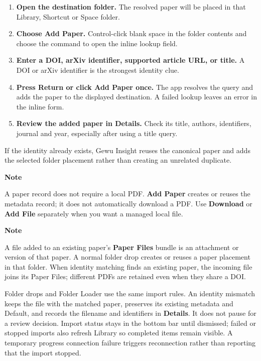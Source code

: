 \documentclass[10pt,letterpaper,oneside]{scrreprt}
\providecommand{\tightlist}{\setlength{\itemsep}{1pt}\setlength{\parskip}{0pt}}
\renewenvironment{quote}
  {\Needspace{5\baselineskip}\begin{tcolorbox}[enhanced,breakable,colback=GewuPale,colframe=GewuPale,boxrule=0pt,
    borderline west={1.6pt}{0pt}{GewuBlue},arc=1.2mm,left=2.5mm,right=2.5mm,top=1.7mm,bottom=1.7mm,
    before skip=4pt,after skip=5pt,fontupper=\color{GewuInk}\small]}
  {\end{tcolorbox}}
\begin{document}
\begin{enumerate}
\tightlist
\item
  \textbf{Open the destination folder.} The resolved paper will be placed in that Library, Shortcut or Space folder.
\item
  \textbf{Choose \textbf{Add Paper}.} Control-click blank space in the folder contents and choose the command to open the inline lookup field.
\item
  \textbf{Enter a DOI, arXiv identifier, supported article URL, or title.} A DOI or arXiv identifier is the strongest identity clue.
\item
  \textbf{Press Return or click \textbf{Add Paper} once.} The app resolves the query and adds the paper to the displayed destination. A failed lookup leaves an error in the inline form.
\item
  \textbf{Review the added paper in Details.} Check its title, authors, identifiers, journal and year, especially after using a title query.
\end{enumerate}

If the identity already exists, Gewu Insight reuses the canonical paper and adds the selected folder placement rather than creating an unrelated duplicate.

\begin{quote}
\textbf{Note}

A paper record does not require a local PDF. \textbf{Add Paper} creates or reuses the metadata record; it does not automatically download a PDF. Use \textbf{Download} or \textbf{Add File} separately when you want a managed local file.
\end{quote}

\begin{quote}
\textbf{Note}

A file added to an existing paper's \textbf{Paper Files} bundle is an attachment or version of that paper. A normal folder drop creates or reuses a paper placement in that folder. When identity matching finds an existing paper, the incoming file joins its Paper Files; different PDFs are retained even when they share a DOI.
\end{quote}

Folder drops and Folder Loader use the same import rules. An identity mismatch keeps the file with the matched paper, preserves its existing metadata and Default, and records the filename and identifiers in \textbf{Details}. It does not pause for a review decision. Import status stays in the bottom bar until dismissed; failed or stopped imports also refresh Library so completed items remain visible. A temporary progress connection failure triggers reconnection rather than reporting that the import stopped.
\end{document}
